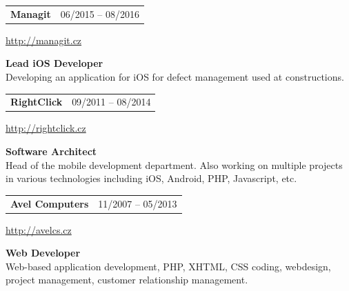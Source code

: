 \documentclass[10pt]{article} %
\begin{document}
{\begin{minipage}[t]{0.44\textwidth}

\begin{tabularx}{\textwidth}{@{}Xr@{}}
\large\textbf{Managit} & \small\textsc{06/2015 -- 08/2016} \\
\end{tabularx}
\normalsize\url{http://managit.cz}

\medskip
\normalsize\textbf{Lead iOS Developer}\\
\small {Developing an application for iOS for defect management used at constructions.}\\
\medskip 


\begin{tabularx}{\textwidth}{@{}Xr@{}}
\large\textbf{RightClick} & \small\textsc{09/2011 -- 08/2014} \\
\end{tabularx}
\normalsize\url{http://rightclick.cz}

\medskip
\normalsize\textbf{Software Architect}\\
\small {Head of the mobile development department. Also working on multiple projects in various technologies including iOS, Android, PHP, Javascript, etc.}\\
\medskip 


\begin{tabularx}{\textwidth}{@{}Xr@{}}
\large\textbf{Avel Computers} & \small\textsc{11/2007 -- 05/2013} \\
\end{tabularx}
\normalsize\url{http://avelcs.cz}

\medskip
\normalsize\textbf{Web Developer}\\
\small {Web-based application development, PHP, XHTML, CSS coding, webdesign, project management, customer relationship management.}\\
\medskip 


\end{minipage} %

\newpage

\begin{minipage}[t]{0.5\textwidth} %
\vspace{0pt} %



\end{minipage}}
\end{document}
